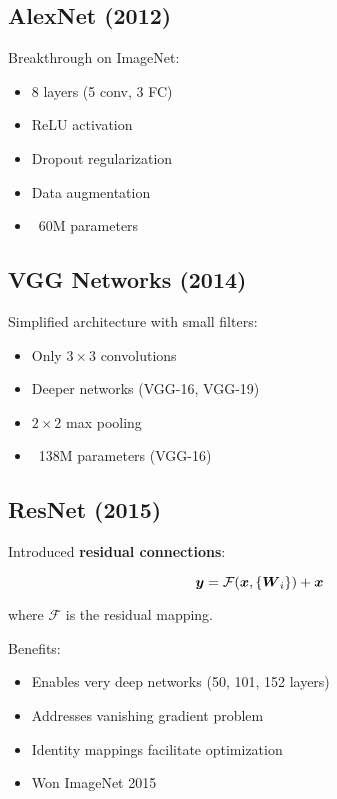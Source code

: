 \subsection{AlexNet (2012)}

Breakthrough on ImageNet:
\begin{itemize}
    \item 8 layers (5 conv, 3 FC)
    \item ReLU activation
    \item Dropout regularization
    \item Data augmentation
    \item ~60M parameters
\end{itemize}

\subsection{VGG Networks (2014)}

Simplified architecture with small filters:
\begin{itemize}
    \item Only $3 \times 3$ convolutions
    \item Deeper networks (VGG-16, VGG-19)
    \item $2 \times 2$ max pooling
    \item ~138M parameters (VGG-16)
\end{itemize}

\subsection{ResNet (2015)}

Introduced \textbf{residual connections}:

\begin{equation}
\boldsymbol{y} = \mathcal{F}(\boldsymbol{x}, \{\boldsymbol{W}_i\}) + \boldsymbol{x}
\end{equation}

where $\mathcal{F}$ is the residual mapping.

Benefits:
\begin{itemize}
    \item Enables very deep networks (50, 101, 152 layers)
    \item Addresses vanishing gradient problem
    \item Identity mappings facilitate optimization
    \item Won ImageNet 2015
\end{itemize}

